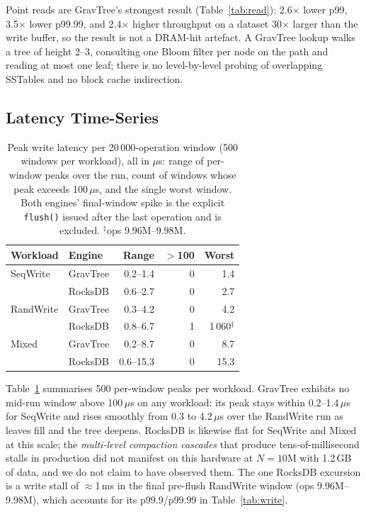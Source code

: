 \documentclass[10pt,twocolumn]{article}
\begin{document}
Point reads are GravTree's strongest result (Table~\ref{tab:read}):
2.6$\times$ lower p99, 3.5$\times$ lower p99.99, and 2.4$\times$ higher
throughput on a dataset 30$\times$ larger than the write buffer, so the
result is not a DRAM-hit artefact.  A GravTree lookup walks a tree of height
2--3, consulting one Bloom filter per node on the path and reading at most
one leaf; there is no level-by-level probing of overlapping SSTables and no
block cache indirection.

\subsection{Latency Time-Series}
\label{sec:timeseries}

\begin{table}[t]
\centering
\footnotesize
\caption{Peak write latency per 20\,000-operation window (500 windows per
workload), all in $\mu$s: range of per-window peaks over the run, count of
windows whose peak exceeds 100\,$\mu$s, and the single worst window.  Both engines'
final-window spike is the explicit \texttt{flush()} issued after the last
operation and is excluded.  $^\ddagger$ops 9.96M--9.98M.}
\label{tab:timeseries}
\setlength{\tabcolsep}{3pt}
\begin{tabular}{llrrr}
\toprule
Workload & Engine & Range & $>$100 & Worst \\
\midrule
SeqWrite  & GravTree & 0.2--1.4  & 0 & 1.4 \\
          & RocksDB  & 0.6--2.7  & 0 & 2.7 \\
RandWrite & GravTree & 0.3--4.2  & 0 & 4.2 \\
          & RocksDB  & 0.8--6.7  & 1 & 1\,060$^\ddagger$ \\
Mixed     & GravTree & 0.2--8.7  & 0 & 8.7 \\
          & RocksDB  & 0.6--15.3 & 0 & 15.3 \\
\bottomrule
\end{tabular}
\end{table}

Table~\ref{tab:timeseries} summarises 500 per-window peaks per workload.
GravTree exhibits no mid-run window above 100\,$\mu$s on any workload: its
peak stays within 0.2--1.4\,$\mu$s for SeqWrite and rises smoothly from
0.3 to 4.2\,$\mu$s over the RandWrite run as leaves fill and the tree
deepens.
RocksDB is likewise flat for SeqWrite and Mixed at this scale; the
\emph{multi-level compaction cascades} that produce tens-of-millisecond
stalls in production did not manifest on this hardware at $N = 10$M with
1.2\,GB of data, and we do not claim to have observed them.  The one RocksDB
excursion is a write stall of $\approx$1\,ms in the final pre-flush RandWrite
window (ops 9.96M--9.98M),
which accounts for its p99.9/p99.99 in Table~\ref{tab:write}.
\end{document}

